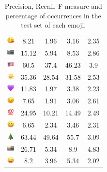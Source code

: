 \documentclass{article}
\begin{document}
\begin{table}
\begin{tabular}{|c|ccc|c|}
\includegraphics[height=0.37cm,width=0.37cm]{img/face_blowing_a_kiss.png} & 8.21 & 1.96 & 3.16 & 2.35\\ 
\includegraphics[height=0.37cm,width=0.37cm]{img/camera.png} & 15.12 & 5.94 & 8.53 & 2.86\\ 
\includegraphics[height=0.37cm,width=0.37cm]{img/United_States.png} & 60.5 & 37.4 & 46.23 & 3.9\\ 
\includegraphics[height=0.37cm,width=0.37cm]{img/sun.png} & 35.36 & 28.54 & 31.58 & 2.53\\ 
\includegraphics[height=0.37cm,width=0.37cm]{img/purple_heart.png} & 11.83 & 1.97 & 3.38 & 2.23\\ 
\includegraphics[height=0.37cm,width=0.37cm]{img/winking_face.png} & 7.65 & 1.91 & 3.06 & 2.61\\ 
\includegraphics[height=0.37cm,width=0.37cm]{img/hundred_points.png} & 24.95 & 10.21 & 14.49 & 2.49\\ 
\includegraphics[height=0.37cm,width=0.37cm]{img/beaming_face_with_smiling_eyes.png} & 6.65 & 2.34 & 3.46 & 2.31\\ 
\includegraphics[height=0.37cm,width=0.37cm]{img/Christmas_tree.png} & 63.44 & 49.64 & 55.7 & 3.09\\ 
\includegraphics[height=0.37cm,width=0.37cm]{img/camera_with_flash.png} & 26.71 & 5.34 & 8.9 & 4.83\\ 
\includegraphics[height=0.37cm,width=0.37cm]{img/winking_face_with_tongue.png} & 8.2 & 3.96 & 5.34 & 2.02\\ 

\hline
\end{tabular}
\caption{\label{table:emoji_detailed} Precision, Recall, F-measure and percentage of occurrences in the test set of each emoji.}
\end{table}
\end{document}
